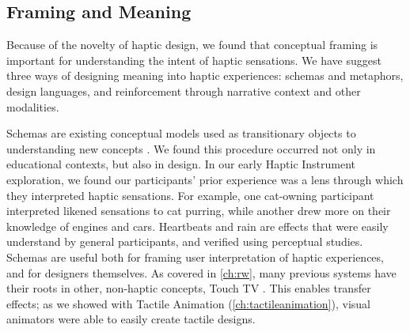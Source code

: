 %
%
\subsection{Framing and Meaning}
Because of the novelty of haptic design, we found that conceptual framing is important for understanding the intent of haptic sensations.
We have suggest three ways of designing meaning into haptic experiences:
schemas and metaphors,
design languages,
and reinforcement through narrative context and other modalities.



Schemas are existing conceptual models used as transitionary objects to understanding new concepts \cite{Papert1980}.
We found this procedure occurred not only in educational contexts, but also in design.
In our early Haptic Instrument exploration, we found our participants' prior experience was a lens through which they interpreted haptic sensations.
For example, one cat-owning participant interpreted likened sensations to cat purring, while another drew more on their knowledge of engines and cars.
Heartbeats and rain \cite{Israr2014} are effects that were easily understand by general participants, and verified using perceptual studies.
Schemas are useful both for framing user interpretation of haptic experiences, and for designers themselves.
As covered in \autoref{ch:rw}, many previous systems have their roots in other, non-haptic concepts, \eg Touch TV \cite{}.
This enables transfer effects; as we showed with Tactile Animation (\autoref{ch:tactileanimation}), visual animators were able to easily create tactile designs.

